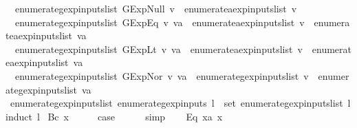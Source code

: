\begin{isabellebody}
\ \ {\isachardoublequoteopen}enumerate{\isacharunderscore}gexp{\isacharunderscore}inputs{\isacharunderscore}list\ {\isacharparenleft}GExp{\isachardot}Null\ v{\isacharparenright}\ {\isacharequal}\ enumerate{\isacharunderscore}aexp{\isacharunderscore}inputs{\isacharunderscore}list\ v{\isachardoublequoteclose}\ {\isacharbar}\isanewline
\ \ {\isachardoublequoteopen}enumerate{\isacharunderscore}gexp{\isacharunderscore}inputs{\isacharunderscore}list\ {\isacharparenleft}GExp{\isachardot}Eq\ v\ va{\isacharparenright}\ {\isacharequal}\ enumerate{\isacharunderscore}aexp{\isacharunderscore}inputs{\isacharunderscore}list\ v\ {\isacharat}\ enumerate{\isacharunderscore}aexp{\isacharunderscore}inputs{\isacharunderscore}list\ va{\isachardoublequoteclose}\ {\isacharbar}\isanewline
\ \ {\isachardoublequoteopen}enumerate{\isacharunderscore}gexp{\isacharunderscore}inputs{\isacharunderscore}list\ {\isacharparenleft}GExp{\isachardot}Lt\ v\ va{\isacharparenright}\ {\isacharequal}\ enumerate{\isacharunderscore}aexp{\isacharunderscore}inputs{\isacharunderscore}list\ v\ {\isacharat}\ enumerate{\isacharunderscore}aexp{\isacharunderscore}inputs{\isacharunderscore}list\ va{\isachardoublequoteclose}\ {\isacharbar}\isanewline
\ \ {\isachardoublequoteopen}enumerate{\isacharunderscore}gexp{\isacharunderscore}inputs{\isacharunderscore}list\ {\isacharparenleft}GExp{\isachardot}Nor\ v\ va{\isacharparenright}\ {\isacharequal}\ enumerate{\isacharunderscore}gexp{\isacharunderscore}inputs{\isacharunderscore}list\ v\ {\isacharat}\ enumerate{\isacharunderscore}gexp{\isacharunderscore}inputs{\isacharunderscore}list\ va{\isachardoublequoteclose}\isanewline
\isanewline
{}\isamarkupfalse%
\ enumerate{\isacharunderscore}gexp{\isacharunderscore}inputs{\isacharunderscore}list{\isacharcolon}\ {\isachardoublequoteopen}enumerate{\isacharunderscore}gexp{\isacharunderscore}inputs\ l\ {\isacharequal}\ set\ {\isacharparenleft}enumerate{\isacharunderscore}gexp{\isacharunderscore}inputs{\isacharunderscore}list\ l{\isacharparenright}{\isachardoublequoteclose}\isanewline
%
\isadelimproof
%
\endisadelimproof
%
\isatagproof
{}\isamarkupfalse%
{\isacharparenleft}induct\ l{\isacharparenright}\isanewline
{}\isamarkupfalse%
\ {\isacharparenleft}Bc\ x{\isacharparenright}\isanewline
\ \ \isamarkupfalse%
\ \isamarkupfalse%
\ {\isacharquery}case\isanewline
\ \ \ \ \isamarkupfalse%
\ simp\isanewline
{}\isamarkupfalse%
\isanewline
\ \ \isamarkupfalse%
\ {\isacharparenleft}Eq\ x{}a\ x{}{\isacharparenright}\isanewline

\end{isabellebody}
